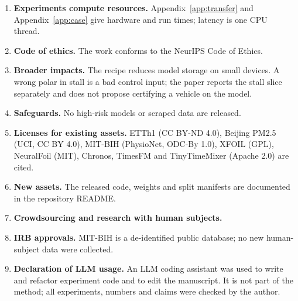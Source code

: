 \begin{enumerate}
\item {\bf Experiments compute resources.} \answerYes{} Appendix~\ref{app:transfer} and Appendix~\ref{app:case} give hardware and run times; latency is one CPU thread.

\item {\bf Code of ethics.} \answerYes{} The work conforms to the NeurIPS Code of Ethics.

\item {\bf Broader impacts.} \answerYes{} The recipe reduces model storage on small devices. A wrong polar in stall is a bad control input; the paper reports the stall slice separately and does not propose certifying a vehicle on the model.

\item {\bf Safeguards.} \answerNA{} No high-risk models or scraped data are released.

\item {\bf Licenses for existing assets.} \answerYes{} ETTh1 (CC BY-ND 4.0), Beijing PM2.5 (UCI, CC BY 4.0), MIT-BIH (PhysioNet, ODC-By 1.0), XFOIL (GPL), NeuralFoil (MIT), Chronos, TimesFM and TinyTimeMixer (Apache 2.0) are cited.

\item {\bf New assets.} \answerYes{} The released code, weights and split manifests are documented in the repository README.

\item {\bf Crowdsourcing and research with human subjects.} \answerNA{}

\item {\bf IRB approvals.} \answerNA{} MIT-BIH is a de-identified public database; no new human-subject data were collected.

\item {\bf Declaration of LLM usage.} \answerYes{} An LLM coding assistant was used to write and refactor experiment code and to edit the manuscript. It is not part of the method; all experiments, numbers and claims were checked by the author.

\end{enumerate}
